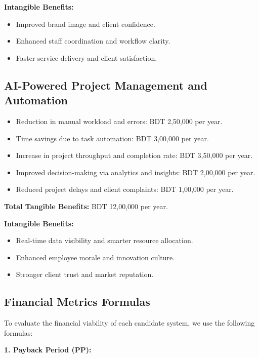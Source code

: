 \documentclass[12pt,a4paper]{article}
\begin{document}
\vspace{0.7cm}
\textbf{Intangible Benefits:}
\begin{itemize}
    \item Improved brand image and client confidence.
    \item Enhanced staff coordination and workflow clarity.
    \item Faster service delivery and client satisfaction.
\end{itemize}

\subsection*{AI-Powered Project Management and Automation}
\begin{itemize}
    \item Reduction in manual workload and errors: BDT 2,50,000 per year.
    \item Time savings due to task automation: BDT 3,00,000 per year.
    \item Increase in project throughput and completion rate: BDT 3,50,000 per year.
    \item Improved decision-making via analytics and insights: BDT 2,00,000 per year.
    \item Reduced project delays and client complaints: BDT 1,00,000 per year.
\end{itemize}
\vspace{0.5cm}
\textbf{Total Tangible Benefits:} BDT 12,00,000 per year.

\vspace{0.7cm}
\textbf{Intangible Benefits:}
\begin{itemize}
    \item Real-time data visibility and smarter resource allocation.
    \item Enhanced employee morale and innovation culture.
    \item Stronger client trust and market reputation.
\end{itemize}

\subsection{Financial Metrics Formulas}

To evaluate the financial viability of each candidate system, we use the following formulas:

\vspace{0.5cm}
\noindent\textbf{1. Payback Period (PP):}
\end{document}
